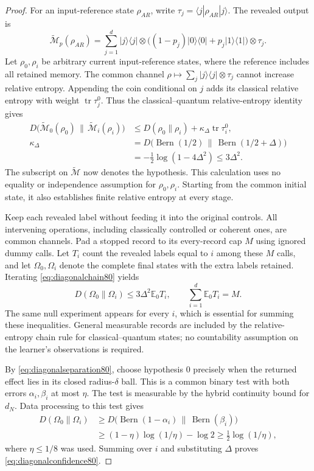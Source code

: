 \begin{proof}
For an input-reference state $\rho_{AR}$, write
$\tau_j=\langle j|\rho_{AR}|j\rangle$.  The revealed output is
\[
 \widetilde{\mathcal M}_{p}(\rho_{AR})
 =\sum_{j=1}^d |j\rangle\langle j|\otimes
      \bigl((1-p_j)|0\rangle\langle0|
                 +p_j|1\rangle\langle1|\bigr)\otimes\tau_j.
\]
Let $\rho_0,\rho_i$ be arbitrary current input-reference states,
where the reference includes all retained memory.  The common
channel $\rho\mapsto\sum_j|j\rangle\langle j|\otimes\tau_j$
cannot increase relative entropy.  Appending the coin conditional
on $j$ adds its classical relative entropy with weight
$\operatorname{tr}\tau_j^0$.  Thus the classical--quantum
relative-entropy identity gives
\begin{equation}\label{eq:diagonalchain80}
 \begin{split}
 D\bigl(\widetilde{\mathcal M}_{0}(\rho_0)
       \,\big\|\,\widetilde{\mathcal M}_{i}(\rho_i)\bigr)
 &\le D(\rho_0\|\rho_i)
       +\kappa_\Delta\operatorname{tr}\tau_i^0,\\
 \kappa_\Delta
 &=D\bigl(\operatorname{Bern}(1/2)
            \,\big\|\,\operatorname{Bern}(1/2+\Delta)\bigr)\\
 &=-\tfrac12\log(1-4\Delta^2)\le3\Delta^2 .
 \end{split}
\end{equation}
The subscript on $\widetilde{\mathcal M}$ now denotes the
hypothesis.  This calculation uses no equality or independence
assumption for $\rho_0,\rho_i$.  Starting from the common initial
state, it also establishes finite relative entropy at every stage.

Keep each revealed label without feeding it into the original
controls.  All intervening operations, including classically
controlled or coherent ones, are common channels.  Pad a stopped
record to its every-record cap $M$ using ignored dummy calls.
Let $T_i$ count the revealed labels equal to $i$ among these $M$
calls, and let $\Omega_0,\Omega_i$ denote the complete final states
with the extra labels retained.  Iterating
\eqref{eq:diagonalchain80} yields
\[
 D(\Omega_0\|\Omega_i)\le3\Delta^2\mathbb E_0T_i,
 \qquad
 \sum_{i=1}^d\mathbb E_0T_i=M.
\]
The same null experiment appears for every $i$, which is essential
for summing these inequalities.  General measurable records are
included by the relative-entropy chain rule for classical--quantum
states; no countability assumption on the learner's observations
is required.

By \eqref{eq:diagonalseparation80}, choose hypothesis $0$ precisely
when the returned effect lies in its closed radius-$\delta$ ball.
This is a common binary test with both errors $\alpha_i,\beta_i$
at most $\eta$.  The test is measurable by the hybrid continuity
bound for $d_N$.  Data processing to this test gives
\[
 \begin{split}
 D(\Omega_0\|\Omega_i)
 &\ge D\bigl(\operatorname{Bern}(1-\alpha_i)
                  \,\big\|\,\operatorname{Bern}(\beta_i)\bigr)\\
 &\ge(1-\eta)\log(1/\eta)-\log2
 \ge\tfrac12\log(1/\eta),
 \end{split}
\]
where $\eta\le1/8$ was used.  Summing over $i$ and substituting
$\Delta$ proves \eqref{eq:diagonalconfidence80}.
\end{proof}

